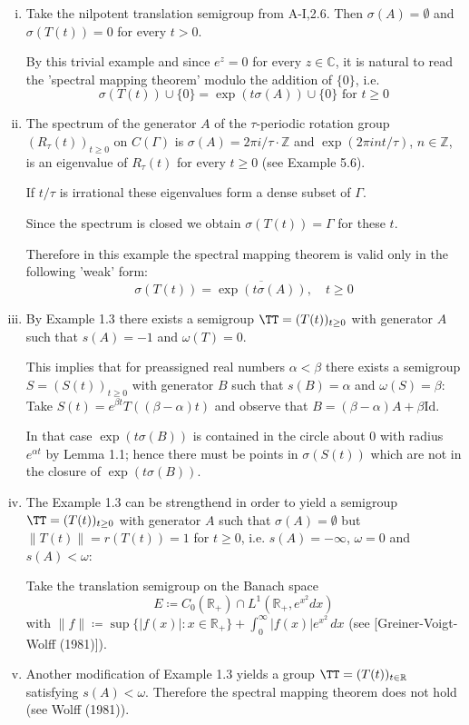 \begin{enumerate}[(i)]
	\item Take the nilpotent translation semigroup from A-I,2.6. Then $\sigma(A) = \emptyset$ and $\sigma(T(t)) = 0$ for every $t > 0$.
	
	By this trivial example and since $e^{z} = 0$ for every $z \in \mathbb{C}$, it is natural to read the 'spectral mapping theorem' modulo the addition of $\{0\}$, i.e.
	\[
	\sigma(T(t)) \cup \{0\} = \exp(t\sigma(A)) \cup \{0\} \text{ for } t \geq 0
	\]
	
	\item The spectrum of the generator $A$ of the $\tau$-periodic rotation group $(R_{\tau}(t))_{t \geq 0}$ on $C(\Gamma)$ is $\sigma(A) = 2\pi i/\tau\cdot\mathbb{Z}$ and $\exp(2\pi int/\tau)$, $n \in \mathbb{Z}$, is an eigenvalue of $R_{\tau}(t)$ for every $t \geq 0$ (see Example 5.6).
	
	If $t/\tau$ is irrational these eigenvalues form a dense subset of $\Gamma$.
	
	Since the spectrum is closed we obtain $\sigma(T(t)) = \Gamma$ for these $t$.
	
	Therefore in this example the spectral mapping theorem is valid only in the following 'weak' form:
	\[
	\sigma(T(t)) = \overline{\exp(t\sigma(A))}, \quad t \geq 0
	\]
	
	\item By Example 1.3 there exists a semigroup $\TT = (T(t))_{t \geq 0}$ with generator $A$ such that $s(A) = -1$ and $\omega(T) = 0$.
	
	This implies that for preassigned real numbers $\alpha < \beta$ there exists a semigroup $S = (S(t))_{t \geq 0}$ with generator $B$ such that $s(B) = \alpha$ and $\omega(S) = \beta$: Take $S(t) = e^{\beta t}T((\beta - \alpha)t)$ and observe that $B = (\beta-\alpha)A + \beta\text{Id}$.
	
	In that case $\exp(t\sigma(B))$ is contained in the circle about $0$ with radius $e^{\alpha t}$ by Lemma 1.1; hence there must be points in $\sigma(S(t))$ which are not in the closure of $\exp(t\sigma(B))$.
	
	\item The Example 1.3 can be strengthend in order to yield a semigroup $\TT = (T(t))_{t \geq 0}$ with generator $A$ such that $\sigma(A) = \emptyset$ but $\|T(t)\| = r(T(t)) = 1$ for $t \geq 0$, i.e. $s(A) = -\infty$, $\omega = 0$ and $s(A) < \omega$:
	
	
\newpage

Take the translation semigroup on the Banach space
\[
E \coloneqq C_{0}(\mathbb{R}_{+}) \cap L^{1}(\mathbb{R}_{+}, e^{x^{2}}dx)
\]
with $\|f\| \coloneqq \sup \{|f(x)| \colon x \in \mathbb{R}_{+}\} + \int_{0}^{\infty} |f(x)|e^{x^{2}} \, dx$ (see [Greiner-Voigt-Wolff (1981)]).

\item Another modification of Example 1.3 yields a group $\TT = (T(t))_{t \in \mathbb{R}}$ satisfying $s(A) < \omega$.
Therefore the spectral mapping theorem does not hold (see Wolff (1981)).
\end{enumerate}

